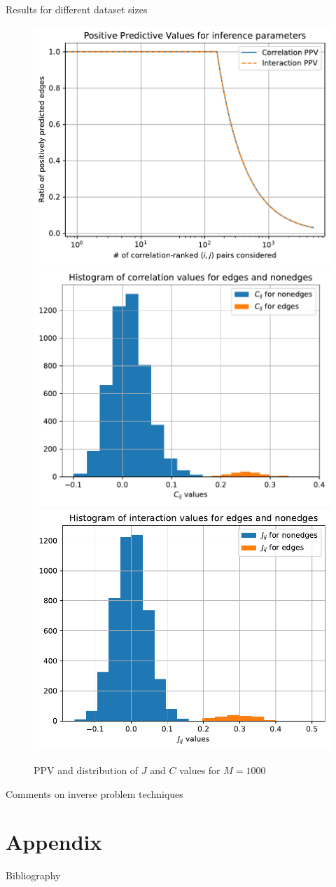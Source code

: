 \documentclass[handout]{beamer}
\begin{document}
\begin{frame}{Results for different dataset sizes}
    \begin{figure}
        \includegraphics[width=.3\textwidth]{ppv_1k}
        \includegraphics[width=.3\textwidth]{nmf_chist_1k}
        \includegraphics[width=.3\textwidth]{nmf_jhist_1k}
        \caption{PPV and distribution of $J$ and $C$ values for $M=1000$}
        \label{fig:nmf_1k}
    \end{figure}
\end{frame}

\begin{frame}{Comments on inverse problem techniques}
\end{frame}

\section{Appendix}

\begin{frame}[allowframebreaks]{Bibliography}
    \printbibliography
\end{frame}
\end{document}
